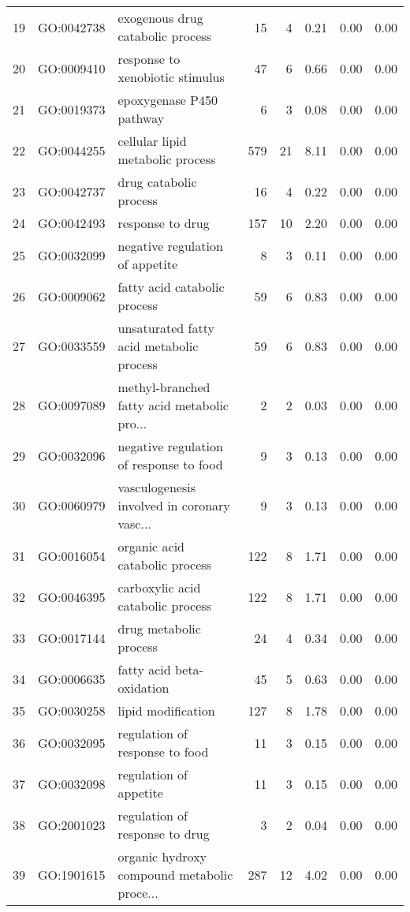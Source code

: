 \begin{table}[ht]
\begin{tabular}{rllrrrrr}
  19 & GO:0042738 & exogenous drug catabolic process &  15 &   4 & 0.21 & 0.00 & 0.00 \\ 
  20 & GO:0009410 & response to xenobiotic stimulus &  47 &   6 & 0.66 & 0.00 & 0.00 \\ 
  21 & GO:0019373 & epoxygenase P450 pathway &   6 &   3 & 0.08 & 0.00 & 0.00 \\ 
  22 & GO:0044255 & cellular lipid metabolic process & 579 &  21 & 8.11 & 0.00 & 0.00 \\ 
  23 & GO:0042737 & drug catabolic process &  16 &   4 & 0.22 & 0.00 & 0.00 \\ 
  24 & GO:0042493 & response to drug & 157 &  10 & 2.20 & 0.00 & 0.00 \\ 
  25 & GO:0032099 & negative regulation of appetite &   8 &   3 & 0.11 & 0.00 & 0.00 \\ 
  26 & GO:0009062 & fatty acid catabolic process &  59 &   6 & 0.83 & 0.00 & 0.00 \\ 
  27 & GO:0033559 & unsaturated fatty acid metabolic process &  59 &   6 & 0.83 & 0.00 & 0.00 \\ 
  28 & GO:0097089 & methyl-branched fatty acid metabolic pro... &   2 &   2 & 0.03 & 0.00 & 0.00 \\ 
  29 & GO:0032096 & negative regulation of response to food &   9 &   3 & 0.13 & 0.00 & 0.00 \\ 
  30 & GO:0060979 & vasculogenesis involved in coronary vasc... &   9 &   3 & 0.13 & 0.00 & 0.00 \\ 
  31 & GO:0016054 & organic acid catabolic process & 122 &   8 & 1.71 & 0.00 & 0.00 \\ 
  32 & GO:0046395 & carboxylic acid catabolic process & 122 &   8 & 1.71 & 0.00 & 0.00 \\ 
  33 & GO:0017144 & drug metabolic process &  24 &   4 & 0.34 & 0.00 & 0.00 \\ 
  34 & GO:0006635 & fatty acid beta-oxidation &  45 &   5 & 0.63 & 0.00 & 0.00 \\ 
  35 & GO:0030258 & lipid modification & 127 &   8 & 1.78 & 0.00 & 0.00 \\ 
  36 & GO:0032095 & regulation of response to food &  11 &   3 & 0.15 & 0.00 & 0.00 \\ 
  37 & GO:0032098 & regulation of appetite &  11 &   3 & 0.15 & 0.00 & 0.00 \\ 
  38 & GO:2001023 & regulation of response to drug &   3 &   2 & 0.04 & 0.00 & 0.00 \\ 
  39 & GO:1901615 & organic hydroxy compound metabolic proce... & 287 &  12 & 4.02 & 0.00 & 0.00 \\ 

\end{tabular}
\end{table}
